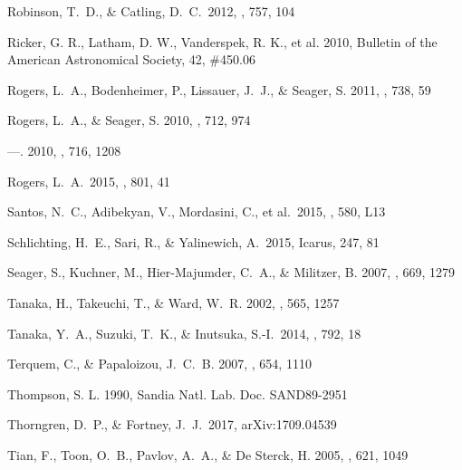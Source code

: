 \documentclass[]{emulateapj}
\begin{document}
\begin{thebibliography}{}
 Robinson, T.~D., \& Catling, D.~C.\ 2012, \apj, 757, 104 

Ricker, G. R., Latham, D. W., Vanderspek, R. K., et al. 2010, Bulletin of the American Astronomical Society, 42, \#450.06


{Rogers}, L.~A., {Bodenheimer}, P., {Lissauer}, J.~J., \& {Seager}, S. 2011,
  \apj, 738, 59

{Rogers}, L.~A., \& {Seager}, S. 2010{}, \apj, 712, 974

---. 2010{}, \apj, 716, 1208

 Rogers, L.~A.\ 2015, \apj, 801, 41 

 Santos, N.~C., Adibekyan, V., Mordasini, C., et al.\ 2015, \aap, 580, L13 


Schlichting, H.~E., Sari, R., \& Yalinewich, A.\ 2015, Icarus, 247, 81 

{Seager}, S., {Kuchner}, M., {Hier-Majumder}, C.~A., \& {Militzer}, B. 2007,
  \apj, 669, 1279

{Tanaka}, H., {Takeuchi}, T., \& {Ward}, W.~R. 2002, \apj, 565, 1257

 Tanaka, Y.~A., Suzuki, T.~K., \& Inutsuka, S.-I.\ 2014, \apj, 792, 18 

{Terquem}, C., \& {Papaloizou}, J.~C.~B. 2007, \apj, 654, 1110

Thompson, S. L. 1990, Sandia Natl. Lab. Doc. SAND89-2951

 Thorngren, D.~P., \& Fortney, J.~J.\ 2017, arXiv:1709.04539 

{Tian}, F., {Toon}, O.~B., {Pavlov}, A.~A., \& {De Sterck}, H. 2005, \apj, 621,
  1049
  

\end{thebibliography}
\end{document}

